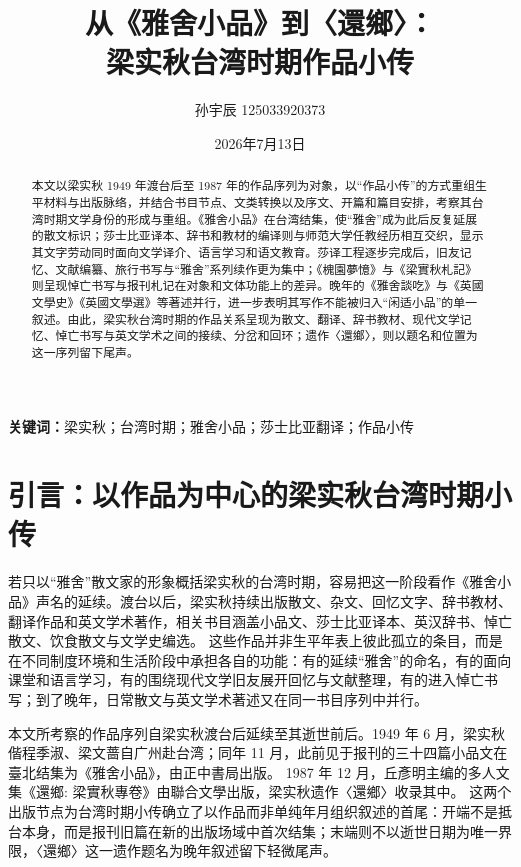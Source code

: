 \documentclass[UTF8,a4paper,zihao=-4,fontset=none]{ctexart}
\title{%
  \papertitlefont\zihao{-2}
  从《雅舍小品》到〈還鄉〉：\\
  梁实秋台湾时期作品小传
}
\author{孙宇辰 125033920373}
\date{2026年7月13日}
\begin{document}
\maketitle

\begin{abstract}
本文以梁实秋 1949 年渡台后至 1987 年的作品序列为对象，以“作品小传”的方式重组生平材料与出版脉络，并结合书目节点、文类转换以及序文、开篇和篇目安排，考察其台湾时期文学身份的形成与重组。《雅舍小品》在台湾结集，使“雅舍”成为此后反复延展的散文标识；莎士比亚译本、辞书和教材的编译则与师范大学任教经历相互交织，显示其文字劳动同时面向文学译介、语言学习和语文教育。莎译工程逐步完成后，旧友记忆、文献编纂、旅行书写与“雅舍”系列续作更为集中；《槐園夢憶》与《梁實秋札記》则呈现悼亡书写与报刊札记在对象和文体功能上的差异。晚年的《雅舍談吃》与《英國文學史》《英國文學選》等著述并行，进一步表明其写作不能被归入“闲适小品”的单一叙述。由此，梁实秋台湾时期的作品关系呈现为散文、翻译、辞书教材、现代文学记忆、悼亡书写与英文学术之间的接续、分岔和回环；遗作〈還鄉〉，则以题名和位置为这一序列留下尾声。
\end{abstract}

\noindent\textbf{关键词：}梁实秋；台湾时期；雅舍小品；莎士比亚翻译；作品小传

\section{引言：以作品为中心的梁实秋台湾时期小传}

若只以“雅舍”散文家的形象概括梁实秋的台湾时期，容易把这一阶段看作《雅舍小品》声名的延续。渡台以后，梁实秋持续出版散文、杂文、回忆文字、辞书教材、翻译作品和英文学术著作，相关书目涵盖小品文、莎士比亚译本、英汉辞书、悼亡散文、饮食散文与文学史编选。\autocite{nmtl_liang_chronology,wenhsun_liang_author} 这些作品并非生平年表上彼此孤立的条目，而是在不同制度环境和生活阶段中承担各自的功能：有的延续“雅舍”的命名，有的面向课堂和语言学习，有的围绕现代文学旧友展开回忆与文献整理，有的进入悼亡书写；到了晚年，日常散文与英文学术著述又在同一书目序列中并行。

本文所考察的作品序列自梁实秋渡台后延续至其逝世前后。1949 年 6 月，梁实秋偕程季淑、梁文蔷自广州赴台湾；同年 11 月，此前见于报刊的三十四篇小品文在臺北结集为《雅舍小品》，由正中書局出版。\autocite{nmtl_liang_chronology,liang_yashe_xiaopin_ncl_scan} 1987 年 12 月，丘彥明主编的多人文集《還鄉: 梁實秋專卷》由聯合文學出版，梁实秋遗作〈還鄉〉收录其中。\cite{1987還鄉} 这两个出版节点为台湾时期小传确立了以作品而非单纯年月组织叙述的首尾：开端不是抵台本身，而是报刊旧篇在新的出版场域中首次结集；末端则不以逝世日期为唯一界限，〈還鄉〉这一遗作题名为晚年叙述留下轻微尾声。
\end{document}
